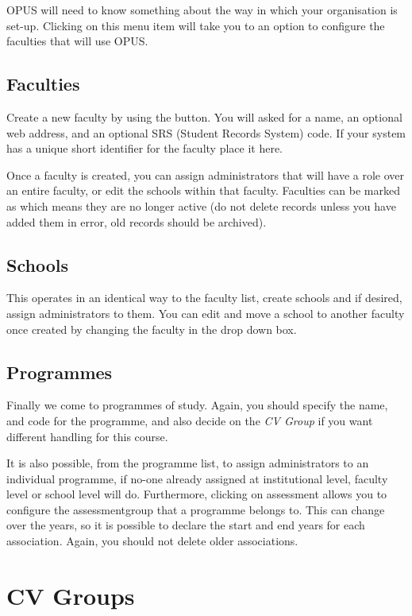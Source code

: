 \documentclass[12 pt]{book}
\begin{document}
OPUS will need to know something about the way in which your organisation is
set-up. Clicking on this menu item will take you to an option to configure the
faculties that will use OPUS.

\subsection{Faculties}

Create a new faculty by using the 
button. You will asked for a name, an optional web address, and an optional SRS
(Student Records System) code. If your system has a unique short identifier for
the faculty place it here.

Once a faculty is created, you can assign administrators that will have a role
over an entire faculty, or edit the schools within that faculty. Faculties can
be marked as  which means they are no longer active (do not
delete records unless you have added them in error, old records should be
archived).

\subsection{Schools}

This operates in an identical way to the faculty list, create schools and if
desired, assign administrators to them. You can edit and move a school to
another faculty once created by changing the faculty in the drop down box.

\subsection{Programmes}

Finally we come to programmes of study. Again, you should specify the name, and
code for the programme, and also decide on the \emph{CV Group} if you want
different handling for this course.

It is also possible, from the programme list, to assign administrators to an
individual programme, if no-one already assigned at institutional level,
faculty level or school level will do. Furthermore, clicking on assessment
allows you to configure the assessmentgroup that a programme belongs to. This
can change over the years, so it is possible to declare the start and end years
for each association. Again, you should not delete older associations.

\section{CV Groups}
\end{document}
